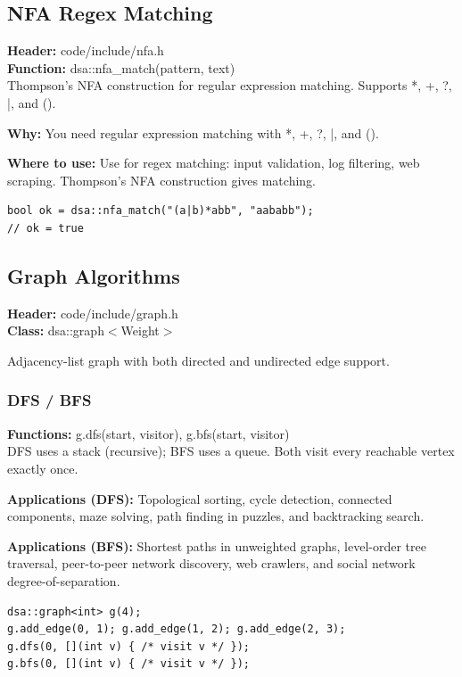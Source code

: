 \documentclass[11pt]{article}
\begin{document}
\subsection{NFA Regex Matching}
\textbf{Header:} code/include/nfa.h\\
\textbf{Function:} dsa::nfa\_match(pattern, text)\\

Thompson's NFA construction for regular expression matching. Supports *, +, ?, |, and ().

\textbf{Why:} You need regular expression matching with *, +, ?, |, and (). \par \textbf{Where to use:} Use for regex matching: input validation, log filtering, web scraping. Thompson's NFA construction gives matching.

\begin{lstlisting}
bool ok = dsa::nfa_match("(a|b)*abb", "aababb");
// ok = true
\end{lstlisting}

\subsection{Graph Algorithms}
\textbf{Header:} code/include/graph.h\\
\textbf{Class:} dsa::graph$<$Weight$>$

Adjacency-list graph with both directed and undirected edge support.

\subsubsection{DFS / BFS}
\textbf{Functions:} g.dfs(start, visitor), g.bfs(start, visitor)\\

DFS uses a stack (recursive); BFS uses a queue. Both visit every reachable vertex exactly once.

\textbf{Applications (DFS):} Topological sorting, cycle detection, connected components, maze solving, path finding in puzzles, and backtracking search.

\textbf{Applications (BFS):} Shortest paths in unweighted graphs, level-order tree traversal, peer-to-peer network discovery, web crawlers, and social network degree-of-separation.

\begin{lstlisting}
dsa::graph<int> g(4);
g.add_edge(0, 1); g.add_edge(1, 2); g.add_edge(2, 3);
g.dfs(0, [](int v) { /* visit v */ });
g.bfs(0, [](int v) { /* visit v */ });
\end{lstlisting}
\end{document}
